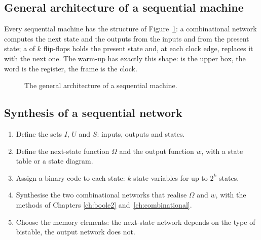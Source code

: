 \subsection{General architecture of a sequential machine}

Every sequential machine has the structure of Figure~\ref{fig:seq:arch}: a
combinational network computes the next state and the outputs from the inputs
and from the present state; a  of $k$ flip-flops holds
the present state and, at each clock edge, replaces it with the next one. The
warm-up has exactly this shape:  is the upper box, the word
 is the register, the frame is the clock.

\begin{figure}[htb]
\centering
{}
\caption{The general architecture of a sequential machine.}
\label{fig:seq:arch}
\end{figure}

\subsection{Synthesis of a sequential network}

\begin{enumerate}
\item Define the sets $I$, $U$ and $S$: inputs, outputs and states.
\item Define the next-state function $\Omega$ and the output function $w$,
  with a state table or a state diagram.
\item Assign a binary code to each state: $k$ state variables for up to
  $2^{k}$ states.
\item Synthesise the two combinational networks that realise $\Omega$ and $w$,
  with the methods of Chapters \ref{ch:boole2} and~\ref{ch:combinational}.
\item Choose the memory elements: the next-state network depends on the type
  of bistable, the output network does not.
\end{enumerate}

